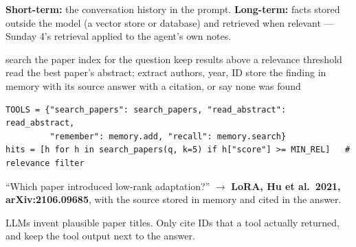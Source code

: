 \documentclass[11pt,a4paper]{article}
\begin{document}

\begin{bdef}
\textbf{Short-term:} the conversation history in the prompt. \textbf{Long-term:} facts stored outside the model (a vector store or database) and retrieved when relevant --- Sunday 4's retrieval applied to the agent's own notes.
\end{bdef}
\begin{balgo}[ScholarAgent]
\begin{algorithmic}[1]
\State search the paper index for the question
\State keep results above a relevance threshold
\State read the best paper's abstract; extract authors, year, ID
\State store the finding in memory with its source
\State answer with a citation, or say none was found
\end{algorithmic}
\end{balgo}
\begin{bcode}
\begin{lstlisting}
TOOLS = {"search_papers": search_papers, "read_abstract": read_abstract,
         "remember": memory.add, "recall": memory.search}
hits = [h for h in search_papers(q, k=5) if h["score"] >= MIN_REL]   # relevance filter
\end{lstlisting}
\end{bcode}
\begin{bres}
``Which paper introduced low-rank adaptation?'' $\rightarrow$ \textbf{LoRA, Hu et al.\ 2021, arXiv:2106.09685}, with the source stored in memory and cited in the answer.
\end{bres}
\begin{bwarn}
LLMs invent plausible paper titles. Only cite IDs that a tool actually returned, and keep the tool output next to the answer.
\end{bwarn}

\end{document}
